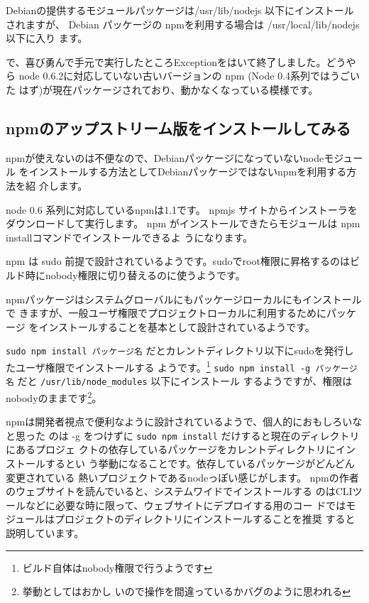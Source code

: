 \documentclass[mingoth,a4paper]{jsarticle}
\begin{document}
Debianの提供するモジュールパッケージは/usr/lib/nodejs 以下にインストール
されますが、
Debian パッケージの npmを利用する場合は /usr/local/lib/nodejs 以下に入り
ます。

で、喜び勇んで手元で実行したところExceptionをはいて終了しました。どうやら
node 0.6.2に対応していない古いバージョンの npm (Node 0.4系列ではうごいた
はず)が現在パッケージされており、動かなくなっている模様です。

\subsection{npmのアップストリーム版をインストールしてみる}

npmが使えないのは不便なので、Debianパッケージになっていないnodeモジュール
をインストールする方法としてDebianパッケージではないnpmを利用する方法を紹
介します。

node 0.6 系列に対応しているnpmは1.1です。
npmjs\cite{npmjs} サイトからインストーラをダウンロードして実行します。
npm がインストールできたらモジュールは npm installコマンドでインストールできるよ
うになります。

npm は sudo 前提で設計されているようです。sudoでroot権限に昇格するのはビ
ルド時にnobody権限に切り替えるのに使うようです。

npmパッケージはシステムグローバルにもパッケージローカルにもインストールで
きますが、一般ユーザ権限でプロジェクトローカルに利用するためにパッケージ
をインストールすることを基本として設計されているようです。

\texttt{sudo npm install パッケージ名}
だとカレントディレクトリ以下にsudoを発行したユーザ権限でインストールする
ようです。\footnote{ビルド自体はnobody権限で行うようです}
\texttt{sudo npm install -g パッケージ名} だと \verb!/usr/lib/node_modules! 以下にインストール
するようですが、権限はnobodyのままです\footnote{挙動としてはおかし
いので操作を間違っているかバグのように思われる}。

npmは開発者視点で便利なように設計されているようで、個人的におもしろいなと思った
のは -g をつけずに \texttt{sudo npm install} だけすると現在のディレクトリにあるプロジェ
クトの依存しているパッケージをカレントディレクトリにインストールするとい
う挙動になることです。依存しているパッケージがどんどん変更されている
熱いプロジェクトであるnodeっぽい感じがします。
npmの作者のウェブサイトを読んでいると、システムワイドでインストールする
のはCLIツールなどに必要な時に限って、ウェブサイトにデプロイする用のコー
ドではモジュールはプロジェクトのディレクトリにインストールすることを推奨
すると説明しています。
\end{document}
